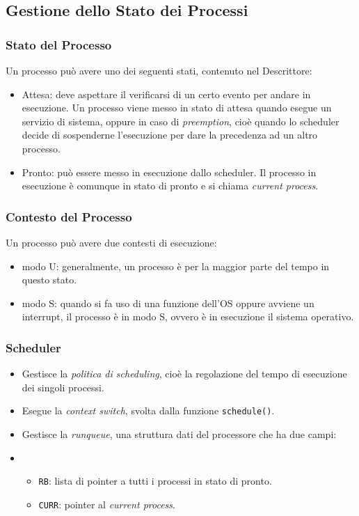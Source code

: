\documentclass[10pt,a4paper]{article}
\newcommand{\code}{\texttt}
\begin{document}
\subsection{Gestione dello Stato dei Processi}

\subsubsection{Stato del Processo}
Un processo può avere uno dei seguenti stati, contenuto nel Descrittore:
\begin{itemize}
    \item Attesa: deve aspettare il verificarsi di un certo evento per andare in esecuzione. Un processo viene messo in stato di attesa quando esegue un servizio di sistema, oppure in caso di \emph{preemption}, cioè quando lo scheduler decide di sospenderne l'esecuzione per dare la precedenza ad un altro processo.
    \item Pronto: può essere messo in esecuzione dallo scheduler. Il processo in esecuzione è comunque in stato di pronto e si chiama \emph{current process}.
\end{itemize}

\subsubsection{Contesto del Processo}
Un processo può avere due contesti di esecuzione:
\begin{itemize}
    \item modo U: generalmente, un processo è per la maggior parte del tempo in questo stato.
    \item modo S: quando si fa uso di una funzione dell'OS oppure avviene un interrupt, il processo è in modo S, ovvero è in esecuzione il sistema operativo.
\end{itemize}

\subsubsection{Scheduler}
\begin{itemize}
    \item Gestisce la \emph{politica di scheduling}, cioè la regolazione del tempo di esecuzione dei singoli processi.
    \item Esegue la \emph{context switch}, svolta dalla funzione \code{schedule()}.
    \item Gestisce la \emph{runqueue}, una struttura dati del processore che ha due campi:
    \item \begin{itemize}
        \item \code{RB}: lista di pointer a tutti i processi in stato di pronto.
        \item \code{CURR}: pointer al \emph{current process}.
    \end{itemize}
\end{itemize}
\end{document}
